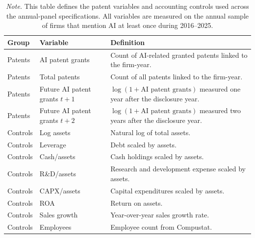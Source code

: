 \begin{table}[p]
\centering
\small
\setlength{\tabcolsep}{4pt}
\renewcommand{\arraystretch}{1.12}
\caption{Variable definitions: patents and accounting controls}
\label{tab:appendix_var_defs_controls}
\begin{tabularx}{\textwidth}{>{\raggedright\arraybackslash}p{}>{\raggedright\arraybackslash}p{}>{\raggedright\arraybackslash}X}
\hline
Group & Variable & Definition \\
\hline
Patents & AI patent grants & Count of AI-related granted patents linked to the firm-year. \\
Patents & Total patents & Count of all patents linked to the firm-year. \\
Patents & Future AI patent grants $t{+}1$ & $\log(1 + \text{AI patent grants})$ measured one year after the disclosure year. \\
Patents & Future AI patent grants $t{+}2$ & $\log(1 + \text{AI patent grants})$ measured two years after the disclosure year. \\
Controls & Log assets & Natural log of total assets. \\
Controls & Leverage & Debt scaled by assets. \\
Controls & Cash/assets & Cash holdings scaled by assets. \\
Controls & R\&D/assets & Research and development expense scaled by assets. \\
Controls & CAPX/assets & Capital expenditures scaled by assets. \\
Controls & ROA & Return on assets. \\
Controls & Sales growth & Year-over-year sales growth rate. \\
Controls & Employees & Employee count from Compustat. \\
\hline
\end{tabularx}
\caption*{\footnotesize \textit{Note.} This table defines the patent variables and accounting controls used across the annual-panel specifications. All variables are measured on the annual sample of firms that mention AI at least once during 2016--2025.}
\end{table}


